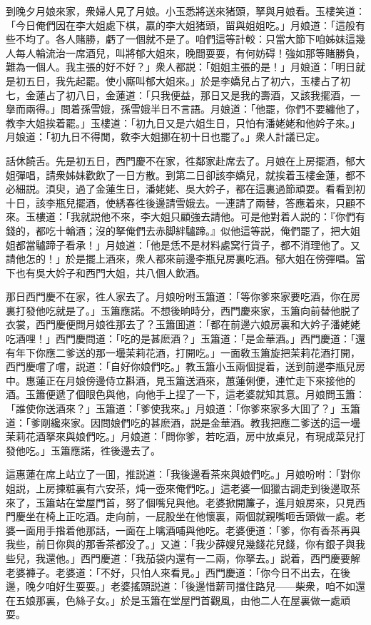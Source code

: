 到晚夕月娘來家，衆婦人見了月娘。小玉悉將送來猪頭，拏與月娘看。玉樓笑道：「今日俺們因在李大姐處下棋，贏的李大姐猪頭，㽞與姐姐吃。」月娘道：「這般有些不均了。各人賭勝，虧了一個就不是了。咱們這等計較：只當大節下咱姊妹這幾人每人輪流治一席酒兒，叫將郁大姐來，晚間耍耍，有何妨碍！強如那等賭勝負，難為一個人。我主張的好不好？」衆人都説：「姐姐主張的是！」月娘道：「明日就是初五日，我先起罷。使小廝叫郁大姐來。」於是李嬌兒占了初六，玉樓占了初七，金蓮占了初八日，金蓮道：「只我便益，那日又是我的壽酒，又該我擺酒，一擧而兩得。」問着孫雪娥，孫雪娥半日不言語。月娘道：「他罷，你們不要纏他了，教李大姐挨着罷。」玉樓道：「初九日又是六姐生日，只怕有潘姥姥和他妗子來。」月娘道：「初九日不得閒，敎李大姐挪在初十日也罷了。」衆人計議已定。

話休饒舌。先是初五日，西門慶不在家，徃鄰家赴席去了。月娘在上房擺酒，郁大姐彈唱，請衆姊妹歡飲了一日方散。到第二日卻該李嬌兒，就挨着玉樓金蓮，都不必細説。湏臾，過了金蓮生日，潘姥姥、吳大妗子，都在這裏過節頑耍。看看到初十日，該李瓶兒擺酒，使綉春徃後邊請雪娥去。一連請了兩替，答應着來，只顧不來。玉樓道：「我就説他不來，李大姐只顧強去請他。可是他對着人説的：『你們有錢的，都吃十輪酒；沒的拏俺們去赤脚絆驢蹄。』似他這等説，俺們罷了，把大姐姐都當驢蹄子看承！」月娘道：「他是恁不是材料處窝行貨子，都不消理他了。又請他怎的！」於是擺上酒來，衆人都來前邊李瓶兒房裏吃酒。郁大姐在傍彈唱。當下也有吳大妗子和西門大姐，共八個人飲酒。

那日西門慶不在家，徃人家去了。月娘吩咐玉簫道：「等你爹來家要吃酒，你在房裏打發他吃就是了。」玉簫應諾。不想後晌時分，西門慶來家，玉簫向前替他脱了衣裳，西門慶便問月娘徃那去了？玉簫囬道：「都在前邊六娘房裏和大妗子潘姥姥吃酒哩！」西門慶問道：「吃的是甚麽酒？」玉簫道：「是金華酒。」西門慶道：「還有年下你應二爹送的那一壜茉莉花酒，打開吃。」一面敎玉簫旋把茉莉花酒打開，西門慶嚐了嚐，説道：「自好你娘們吃。」教玉簫小玉兩個提着，送到前邊李瓶兒房中。惠蓮正在月娘傍邊侍立斟酒，見玉簫送酒來，蕙蓮俐便，連忙走下來接他的酒。玉簫便遞了個眼色與他，向他手上捏了一下，這老婆就知其意。月娘問玉簫：「誰使你送酒來？」玉簫道：「爹使我來。」月娘道：「你爹來家多大囬了？」玉簫道：「爹剛纔來家。因問娘們吃的甚麽酒，説是金華酒。教我把應二爹送的這一壜茉莉花酒拏來與娘們吃。」月娘道：「問你爹，若吃酒，房中放桌兒，有現成菜兒打發他吃。」玉簫應諾，徃後邊去了。

這惠蓮在席上站立了一囬，推説道：「我後邊看茶來與娘們吃。」月娘吩咐：「對你姐説，上房揀粧裏有六安茶，炖一壺來俺們吃。」這老婆一個獵古調走到後邊取茶來了，玉簫站在堂屋門首，努了個嘴兒與他。老婆掀開簾子，進月娘房來，只見西門慶坐在椅上正吃酒。走向前，一屁股坐在他懷裏，兩個就親嘴咂舌頭做一處。老婆一面用手揝着他那話，一面在上噙酒哺與他吃。老婆便道：「爹，你有香茶再與我些，前日你與的那香茶都没了。」又道：「我少薛嫂兒幾錢花兒錢，你有銀子與我些兒，我還他。」西門慶道：「我茄袋内還有一二兩，你拏去。」説着，西門慶要解老婆褲子。老婆道：「不好，只怕人來看見。」西門慶道：「你今日不出去，在後邊，晚夕咱好生耍耍。」老婆搖頭説道：「後邊惜薪司擋住路兒——柴衆，咱不如還在五娘那裏，色絲子女。」於是玉簫在堂屋門首觀風，由他二人在屋裏做一處頑耍。

